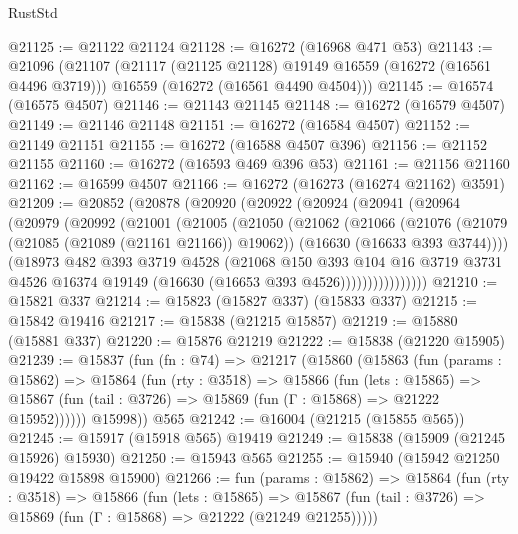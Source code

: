 \begin{lexlean}{RustStd}
\begin{coremodule}
@21125 := @21122 @21124
@21128 := @16272 (@16968 @471 @53)
@21143 := @21096
    (@21107
      (@21117 (@21125 @21128) @19149 @16559 (@16272 (@16561 @4496 @3719)))
      @16559
      (@16272 (@16561 @4490 @4504)))
@21145 := @16574 (@16575 @4507)
@21146 := @21143 @21145
@21148 := @16272 (@16579 @4507)
@21149 := @21146 @21148
@21151 := @16272 (@16584 @4507)
@21152 := @21149 @21151
@21155 := @16272 (@16588 @4507 @396)
@21156 := @21152 @21155
@21160 := @16272 (@16593 @469 @396 @53)
@21161 := @21156 @21160
@21162 := @16599 @4507
@21166 := @16272 (@16273 (@16274 @21162) @3591)
@21209 := @20852
    (@20878
      (@20920
        (@20922
          (@20924
            (@20941
              (@20964
                (@20979
                  (@20992
                    (@21001
                      (@21005
                        (@21050
                          (@21062
                            (@21066
                              (@21076
                                (@21079 (@21085 (@21089 (@21161 @21166)) @19062))
                                (@16630 (@16633 @393 @3744))))
                            (@18973
                              @482
                              @393
                              @3719
                              @4528
                              (@21068
                                @150
                                @393
                                @104
                                @16
                                @3719
                                @3731
                                @4526
                                @16374
                                @19149
                                (@16630 (@16653 @393 @4526))))))))))))))))
@21210 := @15821 @337
@21214 := @15823 (@15827 @337) (@15833 @337)
@21215 := @15842 @19416
@21217 := @15838 (@21215 @15857)
@21219 := @15880 (@15881 @337)
@21220 := @15876 @21219
@21222 := @15838 (@21220 @15905)
@21239 := @15837
    (fun (fn : @74) =>
    @21217
      (@15860
        (@15863
          (fun (params : @15862) =>
          @15864
            (fun (rty : @3518) =>
            @15866
              (fun (lets : @15865) =>
              @15867 (fun (tail : @3726) => @15869 (fun (Γ : @15868) => @21222 @15952))))))
        @15998))
    @565
@21242 := @16004 (@21215 (@15855 @565))
@21245 := @15917 (@15918 @565) @19419
@21249 := @15838 (@15909 (@21245 @15926) @15930)
@21250 := @15943 @565
@21255 := @15940 (@15942 @21250 @19422 @15898 @15900)
@21266 := fun (params : @15862) =>
  @15864
    (fun (rty : @3518) =>
    @15866
      (fun (lets : @15865) =>
      @15867 (fun (tail : @3726) => @15869 (fun (Γ : @15868) => @21222 (@21249 @21255)))))

\end{coremodule}
\end{lexlean}
